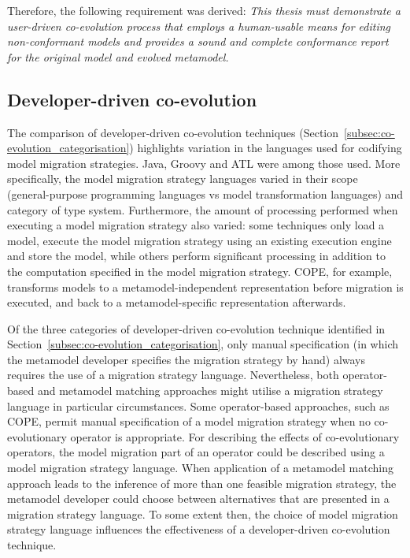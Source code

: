 Therefore, the following requirement was derived: \emph{This thesis must demonstrate a user-driven co-evolution process that employs a human-usable means for editing non-conformant models and provides a sound and complete conformance report for the original model and evolved metamodel.}


\subsection{Developer-driven co-evolution}
The comparison of developer-driven co-evolution techniques (Section~\ref{subsec:co-evolution_categorisation}) highlights variation in the languages used for codifying model migration strategies. Java, Groovy and ATL were among those used. More specifically, the model migration strategy languages varied in their scope (general-purpose programming languages vs model transformation languages) and category of type system. Furthermore, the amount of processing performed when executing a model migration strategy also varied: some techniques only load a model, execute the model migration strategy using an existing execution engine and store the model, while others perform significant processing in addition to the computation specified in the model migration strategy. COPE, for example, transforms models to a metamodel-independent representation before migration is executed, and back to a metamodel-specific representation afterwards.

Of the three categories of developer-driven co-evolution technique identified in Section~\ref{subsec:co-evolution_categorisation}, only manual specification (in which the metamodel developer specifies the migration strategy by hand) always requires the use of a migration strategy language. Nevertheless, both operator-based and metamodel matching approaches might utilise a migration strategy language in particular circumstances. Some operator-based approaches, such as COPE, permit manual specification of a model migration strategy when no co-evolutionary operator is appropriate. For describing the effects of co-evolutionary operators, the model migration part of an operator could be described using a model migration strategy language. When application of a metamodel matching approach leads to the inference of more than one feasible migration strategy, the metamodel developer could choose between alternatives that are presented in a migration strategy language. To some extent then, the choice of model migration strategy language influences the effectiveness of a developer-driven co-evolution technique.  

